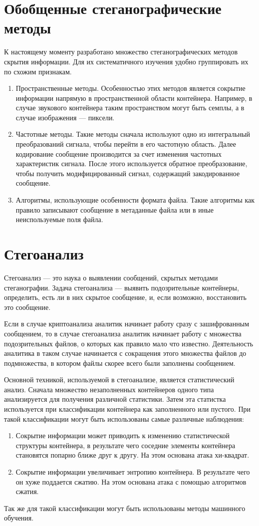 \section{Обобщенные стеганографические методы}
К настоящему моменту разработано множество стеганографических методов скрытия информации.
Для их систематичного изучения удобно группировать их по схожим признакам.
\begin{enumerate}
    \item Пространственные методы. Особенностью этих методов является сокрытие информации напрямую
    в пространственной области контейнера. Например,
    в случае звукового контейнера  таким пространством могут быть семплы,
    а в случае изображения --- пиксели.
    \item Частотные методы. Такие методы сначала используют одно из интегральный преобразований сигнала,
    чтобы перейти в его частотную область. Далее кодирование сообщение производится за счет изменения частотных
    характеристик сигнала. После этого используется обратное преобразование, чтобы получить модифицированный сигнал,
    содержащий закодированное сообщение.
    \item Алгоритмы, использующие особенности формата файла. Такие алгоритмы как правило записывают
    сообщение в метаданные файла или в иные неиспользуемые поля файла.
\end{enumerate}

\section{Стегоанализ}
Стегоанализ --- это наука о выявлении сообщений, скрытых методами стеганографии.
Задача стегоанализа --- выявить подозрительные контейнеры, определить, есть ли в них скрытое сообщение,
и, если возможно, восстановить это сообщение.

Если в случае криптоанализа аналитик начинает работу сразу с зашифрованным сообщением,
то в случае стегоанализа аналитик начинает работу с множества подозрительных файлов,
о которых как правило мало что известно. Деятельность аналитика в таком случае
начинается с сокращения этого множества файлов до подмножества, в котором файлы
скорее всего были заполнены сообщением.

Основной техникой, используемой в стегоанализе, является статистический анализ.
Сначала множество незаполненных контейнеров одного типа анализируется для получения
различной статистики. Затем эта статистка используется при классификации контейнера
как заполненного или пустого. При такой классификации могут быть использованы
самые различные наблюдения:
\begin{enumerate}
    \item Сокрытие информации может приводить к изменению статистической структуры
    контейнера, в результате чего соседние элементы контейнера становятся попарно ближе
    друг к другу. На этом основана атака хи-квадрат.
    \item Сокрытие информации увеличивает энтропию контейнера. В результате чего он
    хуже поддается сжатию. На этом основана атака с помощью алгоритмов сжатия.
\end{enumerate}
Так же для такой классификации могут быть использованы методы машинного обучения.